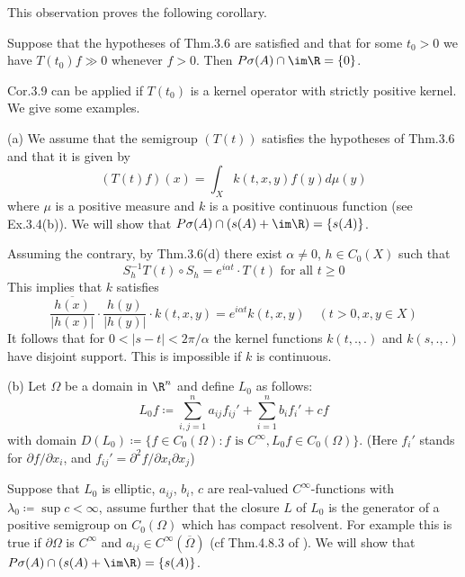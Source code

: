This observation proves the following corollary.
\begin{corollary}\label{cor:b3-3.9}
	Suppose that the hypotheses of Thm.3.6 are satisfied and that for some $t_{0} > 0$ we have $T(t_{0})f \gg 0$ whenever $f > 0$.
	Then $P\sigma(A)\cap \im\R = \{0\}$.
\end{corollary}
Cor.3.9 can be applied if $T(t_{0})$ is a kernel operator with strictly positive kernel.
We give some examples.
%
\begin{examples}\label{ex:b3-3.10}
	
	(a) We assume that the semigroup $(T(t))$ satisfies the hypotheses of Thm.3.6 and that it is given by
	\[
	(T(t)f)(x) = \int_{X} k(t,x,y)f(y) d\mu(y)
	\]
	where $\mu$ is a positive measure and $k$ is a positive continuous function (see Ex.3.4(b)).
	We will show that $P\sigma(A)\cap(s(A) + \im\R) = \{s(A)\}$.
	
	Assuming the contrary, by Thm.3.6(d) there exist $\alpha \neq 0$, $h \in C_{0}(X)$ such that
	\begin{equation}\label{eq:b3-3.10}
	S_{h}^{-1}T(t)\circ S_{h} = e^{i\alpha t}\cdot T(t) \text{ for all } t \geq 0
	\end{equation}
	This implies that $k$ satisfies
	\begin{equation}\label{eq:b3-3.11}
	\frac{\overline{h(x)}}{|h(x)|}\cdot\frac{h(y)}{|h(y)|}\cdot k(t,x,y) = e^{i\alpha t}k(t,x,y) \quad (t > 0, x,y \in X)
	\end{equation}
	It follows that for $0 < |s-t| < 2\pi/\alpha$ the kernel functions  $k(t,.,.)$ and $k(s,.,.)$ have disjoint support.
	This is impossible if $k$ is continuous.
	
	(b) Let $\Omega$ be a domain in $\R^{n}$ and define $L_{0}$ as follows:
	\[
	L_{0}f \coloneq \sum_{i,j=1}^{n} a_{ij}f_{ij}' + \sum_{i=1}^{n}b_{i}f_{i}' + cf
	\]
	with domain $D(L_{0}) \coloneq \{f \in C_{0}(\Omega) : f \text{ is } C^{\infty}, L_{0}f \in C_{0}(\Omega)\}$.
	(Here $f_{i}'$ stands for $\partial f/\partial x_{i}$, and $f_{ij}' = \partial^{2}f/\partial x_{i}\partial x_{j}$)
	
	Suppose that $L_{0}$ is elliptic, $a_{ij}$, $b_{i}$, $c$ are real-valued $C^{\infty}$-functions with $\lambda_{0} \coloneq \sup c < \infty$, assume further that the closure $L$ of $L_{0}$ is the generator of a positive semigroup on $C_{0}(\Omega)$ which has compact resolvent.
	For example this is true if $\partial\Omega$ is $C^{\infty}$ and $a_{ij} \in C^{\infty}(\overline{\Omega})$ (cf Thm.4.8.3 of \citet{fattorini:1983}).
	We will show that $P\sigma(A)\cap(s(A) + \im\R) = \{s(A)\}$.
	

\end{examples}
